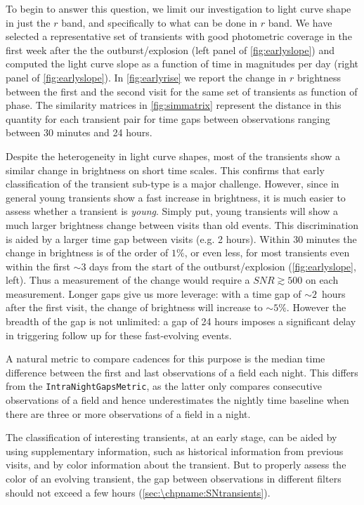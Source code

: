 To begin to answer this question, we limit our investigation to light curve shape in just the $r$ band, and specifically to what can be done in $r$ band. We have selected a representative set of transients with good photometric coverage in the first week after the the outburst/explosion (left panel of \autoref{fig:earlyslope}) and computed the light curve slope as a function of time in magnitudes per day (right panel of \autoref{fig:earlyslope}). In \autoref{fig:earlyrise} we report the change in $r$ brightness between the first and the second visit for the same set of transients as function of phase. The similarity matrices in \autoref{fig:simmatrix} represent the distance in this quantity for each transient pair for time gaps between observations ranging between 30 minutes and 24 hours.

Despite the heterogeneity in light curve shapes, most of the transients show a similar change in brightness on short time scales.
This confirms that early classification of the transient sub-type is a
major challenge. However, since in general young transients show a fast
increase in brightness, it is much easier to assess whether a transient is
\emph{young}.  Simply put, young transients will show a much larger
brightness change between visits than old events.
This discrimination is aided by a larger time gap between visits (e.g. 2 hours).
Within 30 minutes the change in brightness is of the order of $1\%$, or
even less, for most transients even within the first $\sim3$ days from the
start of the outburst/explosion (\autoref{fig:earlyslope}, left). Thus a
measurement of the change would require a $SNR\gtrsim500$ on each
measurement. Longer gaps give us more leverage: with a time gap of
$\sim2$~hours after the first visit, the change of brightness will increase
to $\sim5\%$. However the breadth of the gap is not unlimited: a gap of 24
hours imposes a significant delay in triggering follow up for these
fast-evolving events.

A natural metric to compare cadences for this purpose
is the median time difference between
the first and last observations of a field each night.  This differs from
the \texttt{IntraNightGapsMetric}, as the latter only compares consecutive
observations of a field and hence underestimates the nightly time baseline
when there are three or more observations of a field in a night.

The classification of interesting transients, at an early stage, can be
aided by using supplementary information, such as historical information
from previous visits, and by color information about the transient. But to
properly assess the color of an evolving transient, the
gap between observations in different filters should not exceed a few hours
(\autoref{sec:\chpname:SNtransients}).

